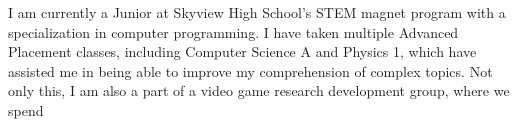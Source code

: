 


I am currently a Junior at Skyview High School’s 
STEM magnet program with a specialization in 
computer programming. I have taken multiple 
Advanced Placement classes, including Computer 
Science A and Physics 1, which have assisted me 
in being able to improve my comprehension of complex
 topics. Not only this, I am also a part of a video 
 game research development group, where we spend 
